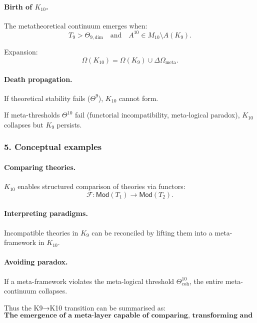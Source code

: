 \paragraph{Birth of $K_{10}$.}
The metatheoretical continuum emerges when:
\[
T_9 > \Theta_{9,\mathrm{dim}}
\quad\text{and}\quad
A^{10} \in M_{10} \setminus A(K_9).
\]

Expansion:
\[
\Omega(K_{10}) = \Omega(K_9) \cup \Delta\Omega_{\mathrm{meta}}.
\]

\paragraph{Death propagation.}
If theoretical stability fails ($\Theta^9$), $K_{10}$ cannot form.

If meta-thresholds $\Theta^{10}$ fail (functorial incompatibility,
meta-logical paradox), $K_{10}$ collapses but $K_9$ persists.

\subsubsection{5. Conceptual examples}

\paragraph{Comparing theories.}
$K_{10}$ enables structured comparison of theories via functors:
\[
\mathcal{F} : \mathsf{Mod}(T_1) \rightarrow \mathsf{Mod}(T_2).
\]

\paragraph{Interpreting paradigms.}
Incompatible theories in $K_9$ can be reconciled by lifting them into a
meta-framework in $K_{10}$.

\paragraph{Avoiding paradox.}
If a meta-framework violates the meta-logical threshold
$\Theta^{10}_{\mathrm{coh}}$, the entire meta-continuum collapses.

Thus the K9→K10 transition can be summarised as:
\[
\textbf{The emergence of a meta-layer capable of comparing, transforming
and reconstructing entire theoretical systems, including itself.}
\]
